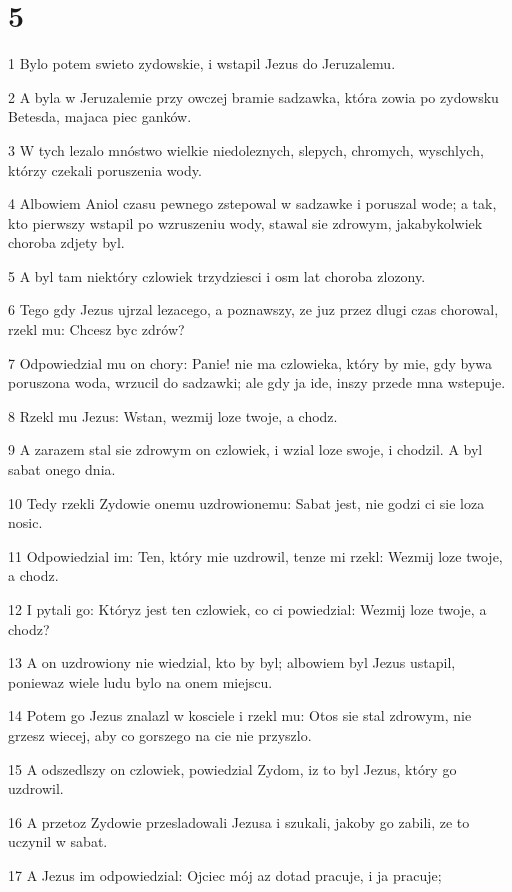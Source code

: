 \chapter{5}

\par 1 Bylo potem swieto zydowskie, i wstapil Jezus do Jeruzalemu.
\par 2 A byla w Jeruzalemie przy owczej bramie sadzawka, która zowia po zydowsku Betesda, majaca piec ganków.
\par 3 W tych lezalo mnóstwo wielkie niedoleznych, slepych, chromych, wyschlych, którzy czekali poruszenia wody.
\par 4 Albowiem Aniol czasu pewnego zstepowal w sadzawke i poruszal wode; a tak, kto pierwszy wstapil po wzruszeniu wody, stawal sie zdrowym, jakabykolwiek choroba zdjety byl.
\par 5 A byl tam niektóry czlowiek trzydziesci i osm lat choroba zlozony.
\par 6 Tego gdy Jezus ujrzal lezacego, a poznawszy, ze juz przez dlugi czas chorowal, rzekl mu: Chcesz byc zdrów?
\par 7 Odpowiedzial mu on chory: Panie! nie ma czlowieka, który by mie, gdy bywa poruszona woda, wrzucil do sadzawki; ale gdy ja ide, inszy przede mna wstepuje.
\par 8 Rzekl mu Jezus: Wstan, wezmij loze twoje, a chodz.
\par 9 A zarazem stal sie zdrowym on czlowiek, i wzial loze swoje, i chodzil. A byl sabat onego dnia.
\par 10 Tedy rzekli Zydowie onemu uzdrowionemu: Sabat jest, nie godzi ci sie loza nosic.
\par 11 Odpowiedzial im: Ten, który mie uzdrowil, tenze mi rzekl: Wezmij loze twoje, a chodz.
\par 12 I pytali go: Któryz jest ten czlowiek, co ci powiedzial: Wezmij loze twoje, a chodz?
\par 13 A on uzdrowiony nie wiedzial, kto by byl; albowiem byl Jezus ustapil, poniewaz wiele ludu bylo na onem miejscu.
\par 14 Potem go Jezus znalazl w kosciele i rzekl mu: Otos sie stal zdrowym, nie grzesz wiecej, aby co gorszego na cie nie przyszlo.
\par 15 A odszedlszy on czlowiek, powiedzial Zydom, iz to byl Jezus, który go uzdrowil.
\par 16 A przetoz Zydowie przesladowali Jezusa i szukali, jakoby go zabili, ze to uczynil w sabat.
\par 17 A Jezus im odpowiedzial: Ojciec mój az dotad pracuje, i ja pracuje;
